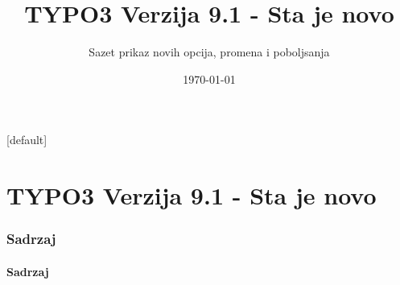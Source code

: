 \documentclass[t]{beamer}
\title{TYPO3 Verzija 9.1 - Sta je novo}
\subtitle{Sazet prikaz novih opcija, promena i poboljsanja}
\date{\today}
\begin{document}
\sharefont


\begingroup
	[default]
	\begin{frame}
		\titlepage
	\end{frame}
\endgroup


\section*{TYPO3 Verzija 9.1 - Sta je novo}
\begin{frame}[fragile]
	\frametitle{Sadrzaj}
	\framesubtitle{Sadrzaj}

	\tableofcontents

\end{frame}










\end{document}
